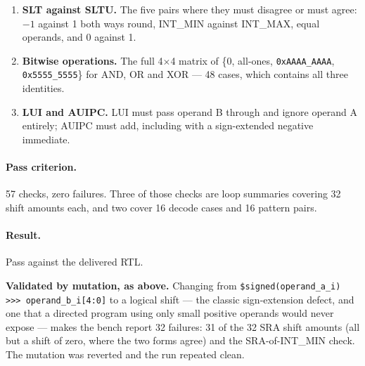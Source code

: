 \begin{enumerate}[leftmargin=*,itemsep=3pt]
\item[\textbf{5}] \textbf{SLT against SLTU.} The five pairs where they must
disagree or must agree: $-1$ against 1 both ways round, INT\_MIN against
INT\_MAX, equal operands, and 0 against 1.

\item[\textbf{6}] \textbf{Bitwise operations.} The full 4$\times$4 matrix of
\{0, all-ones, \texttt{0xAAAA\_AAAA}, \texttt{0x5555\_5555}\} for AND, OR and
XOR --- 48 cases, which contains all three identities.

\item[\textbf{7}] \textbf{LUI and AUIPC.} LUI must pass operand B through and
ignore operand A entirely; AUIPC must add, including with a
sign-extended negative immediate.
\end{enumerate}

\paragraph{Pass criterion.} 57 checks, zero failures. Three of those checks are
loop summaries covering 32 shift amounts each, and two cover 16 decode cases
and 16 pattern pairs.

\paragraph{Result.} Pass against the delivered RTL.

\begin{rtlnote}
\textbf{Validated by mutation, as above.} Changing  from
\texttt{\$signed(operand\_a\_i) >>> operand\_b\_i[4:0]} to a logical shift ---
the classic sign-extension defect, and one that a directed program using only
small positive operands would never expose --- makes the bench report 32
failures: 31 of the 32 SRA shift amounts (all but a shift of zero, where the two
forms agree) and the SRA-of-INT\_MIN check. The mutation was reverted and the
run repeated clean.
\end{rtlnote}
